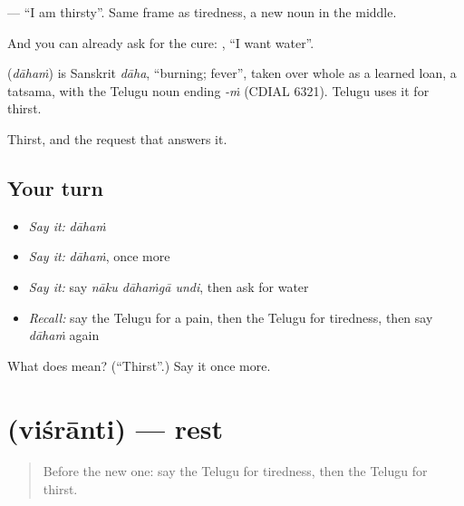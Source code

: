 \textbf{  } — \textquotedblleft{}I am thirsty\textquotedblright{}. Same frame as tiredness, a new noun in the middle.

And you can already ask for the cure: \textbf{  }, \textquotedblleft{}I want water\textquotedblright{}.

\begin{cousinweb}
\textbf{} (\emph{dāhaṁ}) is Sanskrit \emph{dāha}, \textquotedblleft{}burning; fever\textquotedblright{}, taken over whole as a learned loan, a tatsama, with the Telugu noun ending \emph{-ṁ} (CDIAL 6321). Telugu uses it for thirst.
\end{cousinweb}

\begin{grammarlens}[title={What you've built}]
Thirst, and the request that answers it.
\end{grammarlens}

\subsection*{Your turn}
\begin{itemize}
\raggedright
  \item \emph{Say it:} \emph{dāhaṁ}
  \item \emph{Say it:} \emph{dāhaṁ}, once more
  \item \emph{Say it:} say \emph{nāku dāhaṁgā undi}, then ask for water
  \item \emph{Recall:} say the Telugu for a pain, then the Telugu for tiredness, then say \emph{dāhaṁ} again
\end{itemize}

\begin{tcolorbox}[breakable,colback=teal!4,colframe=teal!35!black,title={Before you move on}]
What does  mean? (\textquotedblleft{}Thirst\textquotedblright{}.) Say it once more.
\end{tcolorbox}
\section[\texorpdfstring{\te{విశ్రాంతి} (viśrānti)}{విశ్రాంతి (viśrānti)}]{ (viśrānti) — rest}

\label{lesson:TE-C84-rest}



\begin{quote}
Before the new one: say the Telugu for tiredness, then the Telugu for thirst.
\end{quote}

